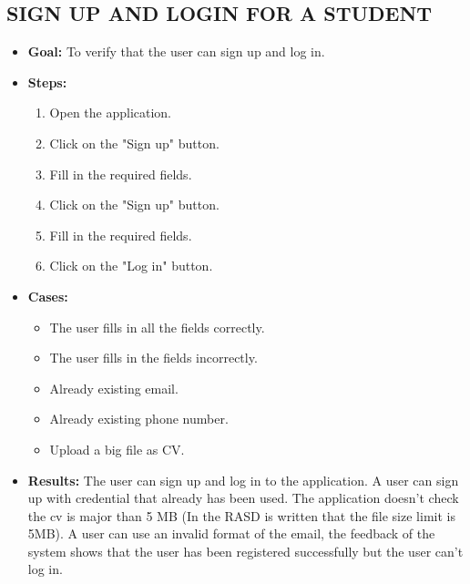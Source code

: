 \subsection{SIGN UP AND LOGIN FOR A STUDENT}\label{subsec:sign-up-and-login-for-a-student}
\begin{itemize}
    \item \textbf{Goal:} To verify that the user can sign up and log in.

    \item \textbf{Steps:}
    \begin{enumerate}
        \item Open the application.
        \item Click on the "Sign up" button.
        \item Fill in the required fields.
        \item Click on the "Sign up" button.
        \item  Fill in the required fields.
        \item Click on the "Log in" button.
    \end{enumerate}
    \item \textbf{Cases:}
    \begin{itemize}
        \item The user fills in all the fields correctly.
        \item The user fills in the fields incorrectly.
        \item Already existing email.
        \item Already existing phone number.
        \item Upload a big file as CV.
    \end{itemize}
    \item \textbf{Results:} The user can sign up and log in to the application.
    A user can sign up with credential that already has been used.
    The application doesn't check the cv is major than 5 MB (In the RASD is written that the file size limit is 5MB).
    A user can use an invalid format of the email, the feedback of the system shows that the user has been registered successfully but the user can't log in.
    \end{itemize}

